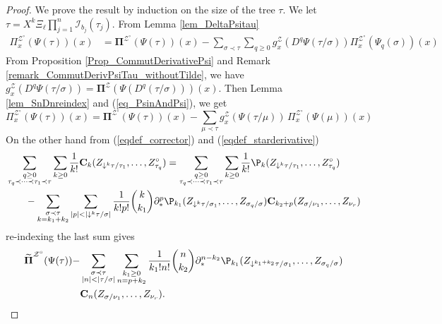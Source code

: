 \documentclass[11pt]{preprint}
\newcommand{\mcI}{\mathcal{I}}
\newcommand{\mcZ}{\mathcal{Z}}
\def\PPi{\boldsymbol{\Pi}}
\def\eqref#1{(\ref{#1})}
\newcommand{\bfC}{{\bf C}}
\begin{document}
\begin{proof}
	We prove the result by induction on the size of the tree $\tau$. We let $\tau= X^k \Xi_\ell \prod_{j=1}^n\mcI_{b_j}(\tau_j)$. From Lemma \ref{lem_DeltaPsitau}
	\begin{align*}
		{ \Pi}_x^{\mcZ^\circ}(\Psi(\tau))(x) &= 	{ \PPi}^{\mcZ^\circ}(\Psi(\tau))(x) - \sum_{ \sigma\prec\tau }\sum_{q\geq 0}  {g}_x^\mcZ(D^q\Psi(\tau/\sigma))  { \Pi}_x^{\mcZ^\circ}(\Psi_q(\sigma))(x)
	\end{align*}
From Proposition \ref{Prop_CommutDerivativePsi} and Remark \ref{remark_CommutDerivPsiTau_withoutTilde}, we have $ {g}_x^\mcZ(D^q\Psi(\tau/\sigma)) =  {\PPi}^\mcZ(\Psi(D^q(\tau/\sigma)))(x)$. Then Lemma \ref{lem_SnDnreindex} and \eqref{eq_PsinAndPsi}, we get
		\begin{equation}\label{eq_Pixtau(x)_dev}
		{ \Pi}_x^{\mcZ^\circ}(\Psi(\tau))(x) = 	{ \PPi}^{\mcZ^\circ}(\Psi(\tau))(x) - \sum_{ \mu\prec\tau }  {g}_x^\mcZ(\Psi(\tau/\mu)) \,  { \Pi}_x^{\mcZ^\circ}(\Psi(\mu))(x)
	\end{equation}
On the other hand from \eqref{eqdef_corrector} and \eqref{eqdef_starderivative} 
	\begin{align*}
		&\sum_{\substack{q\geq 0 \\ \tau_q\prec\dots\prec\tau_1\prec\tau}}\sum_{k\geq 0} \frac{1}{k!}{\bf C}_k(Z_{\downarrow^k\tau/\tau_1},\dots, Z_{\tau_q}^\circ) 
		= 	\sum_{\substack{q\geq 0 \\ \tau_q\prec\dots\prec\tau_1\prec\tau}}\sum_{k\geq 0} \frac{1}{k!}{\P }_k(Z_{\downarrow^k\tau/\tau_1},\dots, Z_{\tau_q}^\circ) 
		\\
		&\qquad- \sum_{\substack{\sigma\prec\tau \\ k=k_1+k_2}}\sum_{|p|<|\downarrow^k\tau/\sigma|} \frac{1}{k!p!} \binom{k}{k_1} \partial^p_*\P_{k_1}(Z_{\downarrow^k\tau/\sigma_1},\dots,Z_{\sigma_q/\sigma}) \bfC_{k_2+p}( Z_{\sigma/\nu_1},\dots, Z_{\nu_r}) 
		\end{align*}
		re-indexing the last sum gives
		\begin{align*}
			 \widetilde{\PPi}^{\mcZ^\circ}(\Psi(\tau)) - & \sum_{\substack{\sigma\prec\tau \\ |n|<|\tau/\sigma|}}\sum_{\substack{k_1\geq 0 \\ n=p+k_2}} \frac{1}{k_1!n!}\binom{n}{k_2}     \partial^{n-k_2}_*\P_{k_1}(Z_{\downarrow^{k_1+k_2}\tau/\sigma_1},\dots,Z_{\sigma_q/\sigma}) \\ & \bfC_{n}( Z_{\sigma/\nu_1},\dots, Z_{\nu_r}). 
		\end{align*}

\end{proof}
\end{document}
